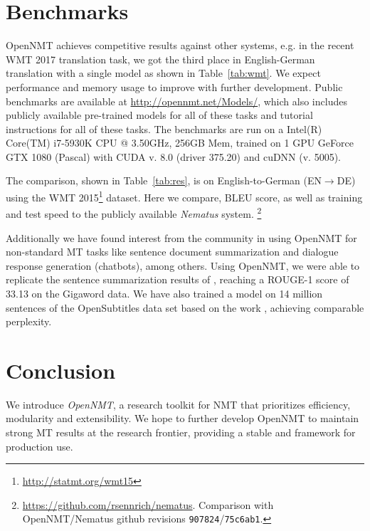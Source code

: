 \documentclass[]{article}
\begin{document}
\section{Benchmarks}

OpenNMT achieves competitive results against other systems, e.g. in the recent WMT 2017 translation task, we got the third place in English-German translation with a single model as shown in Table~\ref{tab:wmt}. We expect performance and
memory usage to improve with further development.  Public benchmarks
are available at \url{http://opennmt.net/Models/}, which also includes
publicly available pre-trained models for all of these tasks and
tutorial instructions for all of these tasks. The benchmarks are
run on a Intel(R) Core(TM) i7-5930K CPU @ 3.50GHz, 256GB Mem,
trained on 1 GPU GeForce GTX 1080 (Pascal) with CUDA v. 8.0 (driver
375.20) and cuDNN (v. 5005).

The comparison, shown in Table~\ref{tab:res}, is on English-to-German
(EN$\rightarrow$DE) using the WMT
2015\footnote{\url{http://statmt.org/wmt15}} dataset. Here we compare,
BLEU score, as well as training and test speed to the publicly
available \textit{Nematus} system. 
\footnote{\url{https://github.com/rsennrich/nematus}. Comparison with
  OpenNMT/Nematus github revisions {\tt 907824}/{\tt 75c6ab1}.}


Additionally we have found interest from the community in using
OpenNMT for non-standard MT tasks like sentence document summarization and
dialogue response generation (chatbots), among others.  Using
OpenNMT, we were able to replicate the sentence summarization results
of \citet{chopra2016abstractive}, reaching a ROUGE-1 score of 33.13 on
the Gigaword data. We have also trained a model on 14 million
sentences of the OpenSubtitles data set based on the work
\citet{vinyals2015neural}, achieving comparable perplexity.













\section{Conclusion}

We introduce \textit{OpenNMT}, a research toolkit for NMT that
prioritizes efficiency, modularity and extensibility. We hope to further develop
OpenNMT to maintain strong MT results at the research frontier, 
providing a stable and framework for production use.
\newpage
\small



\end{document}
